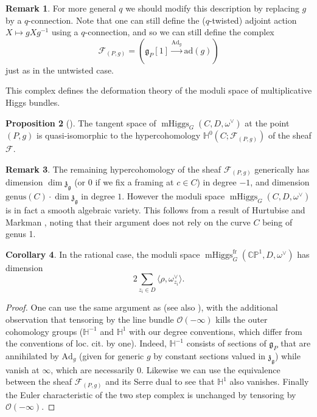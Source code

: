 \documentclass[11pt, oneside, reqno]{amsart}
\theoremstyle{definition} \newtheorem{definition}{Definition}[section]
\newtheorem{prop}[definition]{Proposition}
\newtheorem{corollary}[definition]{Corollary}
\theoremstyle{definition} \newtheorem{remark}[definition]{Remark}
\theoremstyle{definition} \newtheorem{remarks}[definition]{Remarks}
\theoremstyle{definition} \newtheorem{question}[definition]{Question}
\theoremstyle{definition} \newtheorem*{note}{Note}
\theoremstyle{definition} \newtheorem{example}[definition]{Example}
\theoremstyle{definition} \newtheorem{examples}[definition]{Examples}
\renewcommand{\gg}{\mathfrak{g}}
\newcommand{\bb}[1]{\mathbb{#1}}
\newcommand{\mr}[1]{\mathrm{#1}}
\newcommand{\mc}[1]{\mathcal{#1}}
\newcommand{\mf}[1]{\mathfrak{#1}}
\newcommand{\OO}{\mathcal{O}}
\DeclareMathOperator{\mhiggs}{mHiggs}
\newcommand{\fr}{\mathrm{fr}}
\newcommand{\ad}{\mr{ad}}
\newcommand{\Ad}{\mr{Ad}}
\begin{document}
\begin{remark}
For more general $q$ we should modify this description by replacing $g$ by a $q$-connection.  Note that one can still define the ($q$-twisted) adjoint action $X \mapsto g X g^{-1}$ using a $q$-connection, and so we can still define the complex
\[\mc F_{(P,g)} = (\gg_P[1] \overset {\Ad_g} {\to} \ad(g))\]
just as in the untwisted case.
\end{remark}

This complex defines the deformation theory of the moduli space of multiplicative Higgs bundles.

\begin{prop}[{\cite[Proposition 3.1.3]{Bottacin}}]
The tangent space of $\mhiggs_G(C, D, \omega^\vee)$ at the point $(P,g)$ is quasi-isomorphic to the hypercohomology $\bb H^0(C; \mc F_{(P,g)})$ of the sheaf $\mc F$.
\end{prop}

\begin{remark}
The remaining hypercohomology of the sheaf $\mc F_{(P,g)}$ generically has dimension $\dim \mf z_{\gg}$ (or 0 if we fix a framing at $c \in C$) in degree $-1$, and dimension $\mr{genus}(C) \cdot \dim \mf z_{\gg}$ in degree $1$.  However the moduli space $\mhiggs_G(C, D,\omega^\vee)$ is in fact a smooth algebraic variety.  This follows from a result of Hurtubise and Markman \cite[Theorem 4.13]{HurtubiseMarkman}, noting that their argument does not rely on the curve $C$ being of genus 1.
\end{remark}

\begin{corollary} \label{dim_of_moduli_space_cor}
In the rational case, the moduli space $\mhiggs^\fr_G(\bb{CP}^1, D, \omega^\vee)$ has dimension 
\[2 \sum_{z_i \in D} \langle \rho, \omega^\vee_{z_i} \rangle.\]
\end{corollary}

\begin{proof}
One can use the same argument as \cite{HurtubiseMarkman} (see also \cite[Proposition 5.6]{CharbonneauHurtubise}), with the additional observation that tensoring by the line bundle $\OO(-\infty)$ kills the outer cohomology groups ($\bb H^{-1}$ and $\bb H^1$ with our degree conventions, which differ from the conventions of loc. cit. by one).  Indeed, $\bb H^{-1}$ consists of sections of $\gg_P$ that are annihilated by $\Ad_g$ (given for generic $g$ by constant sections valued in $\mf z_{\gg}$) while vanish at $\infty$, which are necessarily 0.  Likewise we can use the equivalence between the sheaf $\mc F_{(P,g)}$ and its Serre dual to see that $\bb H^1$ also vanishes.  Finally the Euler characteristic of the two step complex is unchanged by tensoring by $\OO(-\infty)$. 
\end{proof}
\end{document}
